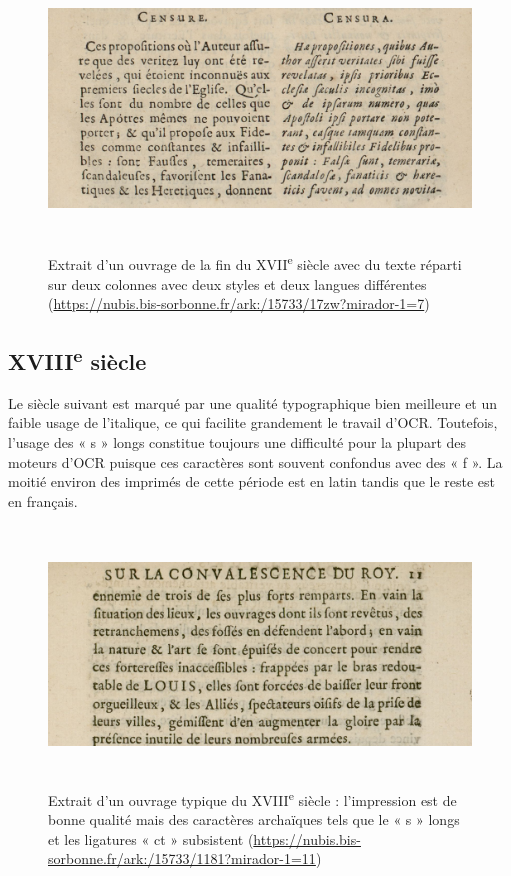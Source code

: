 \documentclass[a4paper,12pt,twoside]{book}
\begin{document}
\begin{figure} [H]
	\includegraphics[width=6.13056in,height=2.89236in]{vertopal_157ae480aa4a4b07be198b586a812241/media/image9.png}
	\caption{Extrait d'un ouvrage de la fin du XVII\textsuperscript{e}
		siècle avec du texte réparti sur deux colonnes avec deux styles et deux
		langues différentes
		(\url{https://nubis.bis-sorbonne.fr/ark:/15733/17zw?mirador-1=7})}
\end{figure}



\subsection{XVIII\textsuperscript{e} siècle}

Le siècle suivant est marqué par une qualité typographique bien
meilleure et un faible usage de l'italique, ce qui facilite grandement
le travail d'OCR. Toutefois, l'usage des « s » longs constitue toujours
une difficulté pour la plupart des moteurs d'OCR puisque ces caractères
sont souvent confondus avec des « f ». La moitié environ des imprimés de
cette période est en latin tandis que le reste est en français.

\begin{figure} [H]
	\includegraphics[width=6.17222in,height=2.67569in]{vertopal_157ae480aa4a4b07be198b586a812241/media/image10.png}
	\caption{Extrait d'un ouvrage typique du XVIII\textsuperscript{e}
		siècle : l'impression est de bonne qualité mais des caractères
		archaïques tels que le « s » longs et les ligatures « ct » subsistent
		(\url{https://nubis.bis-sorbonne.fr/ark:/15733/1181?mirador-1=11})}
\end{figure}
\end{document}
